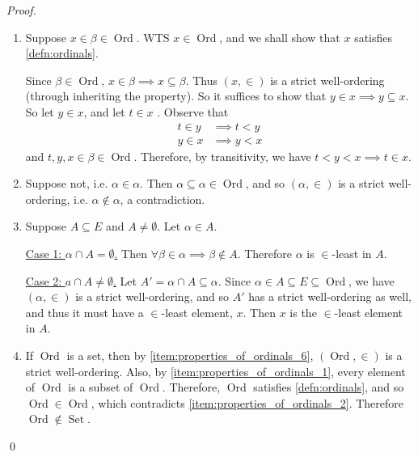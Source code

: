 \documentclass[notoc,notitlepage]{tufte-book}
\DeclareMathOperator{\Ord}{Ord }
\DeclareMathOperator{\Set}{Set }
\begin{document}
\begin{proof}
  \begin{enumerate}
    \item Suppose $x \in \beta \in \Ord$. WTS $x \in \Ord$, and we shall show that $x$ satisfies \cref{defn:ordinals}.

      Since $\beta \in \Ord, \, x \in \beta \implies x \subseteq \beta$. Thus $(x, \in)$ is a strict well-ordering (through inheriting the property). So it suffices to show that $y \in x \implies y \subseteq x$. So let $y \in x$, and let $t \in x$ . Observe that
      \begin{align*}
        t \in y &\implies t < y \\
        y \in x &\implies y < x
      \end{align*}
      and $t, y, x \in \beta \in \Ord$. Therefore, by transitivity, we have $t < y < x \implies t \in x$.

    \item Suppose not, i.e. $\alpha \in \alpha$. Then $\alpha \subseteq \alpha \in \Ord$, and so $(\alpha, \in)$ is a strict well-ordering, i.e. $\alpha \notin \alpha$, a contradiction.

    \setcounter{enumi}{5}
    \item Suppose $A \subseteq E$ and $A \neq \emptyset$. Let $\alpha \in A$.

      \noindent\underline{Case 1: $\alpha \cap A = \emptyset$.} Then $\forall \beta \in \alpha \implies \beta \notin A$. Therefore $\alpha$ is $\in$-least in $A$.

      \noindent\underline{Case 2: $a \cap A \neq \emptyset$.} Let $A' = \alpha \cap A \subseteq \alpha$. Since $\alpha \in A \subseteq E \subseteq \Ord$, we have $(\alpha, \in)$ is a strict well-ordering, and so $A'$ has a strict well-ordering as well, and thus it must have a $\in$-least element, $x$. Then $x$ is the $\in$-least element in $A$.

    \item If $\Ord$ is a set, then by \cref{item:properties_of_ordinals_6}, $(\Ord, \in)$ is a strict well-ordering. Also, by \cref{item:properties_of_ordinals_1}, every element of $\Ord$ is a subset of $\Ord$. Therefore, $\Ord$ satisfies \cref{defn:ordinals}, and so $\Ord \in \Ord$, which contradicts \cref{item:properties_of_ordinals_2}. Therefore $\Ord \notin \Set$.
  \end{enumerate}\qed
\end{proof}
\end{document}
